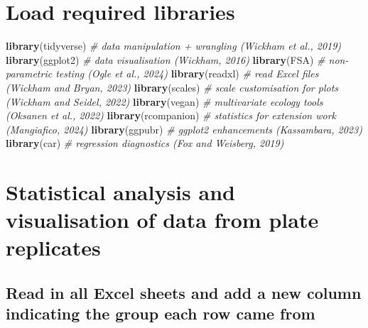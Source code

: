 \documentclass[
]{article}
\newenvironment{Shaded}{\begin{snugshade}}{\end{snugshade}}
\newcommand{\AttributeTok}[1]{\textcolor[rgb]{0.13,0.29,0.53}{#1}}
\newcommand{\CommentTok}[1]{\textcolor[rgb]{0.56,0.35,0.01}{\textit{#1}}}
\newcommand{\ControlFlowTok}[1]{\textcolor[rgb]{0.13,0.29,0.53}{\textbf{#1}}}
\newcommand{\FunctionTok}[1]{\textcolor[rgb]{0.13,0.29,0.53}{\textbf{#1}}}
\newcommand{\NormalTok}[1]{#1}
\newcommand{\OtherTok}[1]{\textcolor[rgb]{0.56,0.35,0.01}{#1}}
\newcommand{\SpecialCharTok}[1]{\textcolor[rgb]{0.81,0.36,0.00}{\textbf{#1}}}
\newcommand{\StringTok}[1]{\textcolor[rgb]{0.31,0.60,0.02}{#1}}
\begin{document}
\section{Load required libraries}\label{load-required-libraries}

\begin{Shaded}
\begin{Highlighting}[]
\FunctionTok{library}\NormalTok{(tidyverse)      }\CommentTok{\# data manipulation + wrangling (Wickham et al., 2019)}
\FunctionTok{library}\NormalTok{(ggplot2)        }\CommentTok{\# data visualisation (Wickham, 2016)}
\FunctionTok{library}\NormalTok{(FSA)            }\CommentTok{\# non{-}parametric testing (Ogle et al., 2024)}
\FunctionTok{library}\NormalTok{(readxl)         }\CommentTok{\# read Excel files (Wickham and Bryan, 2023)}
\FunctionTok{library}\NormalTok{(scales)         }\CommentTok{\# scale customisation for plots (Wickham and Seidel, 2022)}
\FunctionTok{library}\NormalTok{(vegan)          }\CommentTok{\# multivariate ecology tools (Oksanen et al., 2022)}
\FunctionTok{library}\NormalTok{(rcompanion)     }\CommentTok{\# statistics for extension work (Mangiafico, 2024)}
\FunctionTok{library}\NormalTok{(ggpubr)         }\CommentTok{\# ggplot2 enhancements (Kassambara, 2023)}
\FunctionTok{library}\NormalTok{(car)            }\CommentTok{\# regression diagnostics (Fox and Weisberg, 2019)}
\end{Highlighting}
\end{Shaded}

\section{Statistical analysis and visualisation of data from plate
replicates}\label{statistical-analysis-and-visualisation-of-data-from-plate-replicates}

\subsection{Read in all Excel sheets and add a new column indicating the
group each row came
from}\label{read-in-all-excel-sheets-and-add-a-new-column-indicating-the-group-each-row-came-from}

\begin{Shaded}
\end{Shaded}
\end{document}
